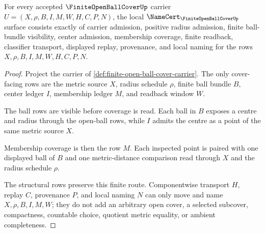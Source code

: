 \begin{theorem}
\label{thm:finite-open-ball-cover-namecert-obligations}
For every accepted $\FiniteOpenBallCoverUp$ carrier $U=(X,\rho,B,I,M,W,H,C,P,N)$, the local $\NameCert_{\FiniteOpenBallCoverUp}$ surface consists exactly of carrier admission, positive radius admission, finite ball-bundle visibility, center admission, membership coverage, finite readback, classifier transport, displayed replay, provenance, and local naming for the rows $X,\rho,B,I,M,W,H,C,P,N$.
\end{theorem}
\begin{proof}
Project the carrier of \autoref{def:finite-open-ball-cover-carrier}. The only cover-facing rows are the metric source $X$, radius schedule $\rho$, finite ball bundle $B$, center ledger $I$, membership ledger $M$, and readback window $W$.

The ball rows are visible before coverage is read. Each ball in $B$ exposes a centre and radius through the open-ball rows, while $I$ admits the centre as a point of the same metric source $X$.

Membership coverage is then the row $M$. Each inspected point is paired with one displayed ball of $B$ and one metric-distance comparison read through $X$ and the radius schedule $\rho$.

The structural rows preserve this finite route. Componentwise transport $H$, replay $C$, provenance $P$, and local naming $N$ can only move and name $X,\rho,B,I,M,W$; they do not add an arbitrary open cover, a selected subcover, compactness, countable choice, quotient metric equality, or ambient completeness.
\end{proof}

\begin{closurestatus}{\FiniteOpenBallCoverUp}
  \theoryclosure{\seedClosure}
  \formalstatus{\unformalizedV}
\end{closurestatus}
